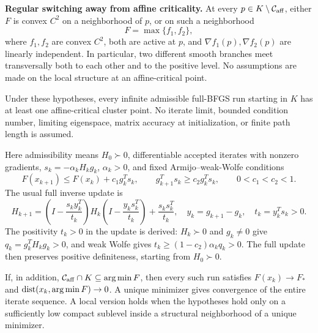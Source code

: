 \textbf{Regular switching away from affine criticality.} At every $p\in K\setminus\mathcal C_{\rm aff}$, either $F$ is convex $C^2$ on a neighborhood of $p$, or on such a neighborhood
\[
 F=\max\{f_1,f_2\},
\]
where $f_1,f_2$ are convex $C^2$, both are active at $p$, and $\nabla f_1(p),\nabla f_2(p)$ are linearly independent. In particular, two different smooth branches meet transversally both to each other and to the positive level. No assumptions are made on the local structure at an affine-critical point.

\begin{theorem}\label{C:thm:cluster}
Under these hypotheses, every infinite admissible full-BFGS run starting in $K$ has at least one affine-critical cluster point. No iterate limit, bounded condition number, limiting eigenspace, matrix accuracy at initialization, or finite path length is assumed.
\end{theorem}

Here admissibility means $H_0\succ0$, differentiable accepted iterates with nonzero gradients, $s_k=-\alpha_kH_kg_k$, $\alpha_k>0$, and fixed Armijo--weak-Wolfe conditions
\begin{equation}\label{C:eq:AW}
 F(x_{k+1})\le F(x_k)+c_1g_k^Ts_k,\qquad
 g_{k+1}^Ts_k\ge c_2g_k^Ts_k,\qquad 0<c_1<c_2<1.
\end{equation}
The usual full inverse update is
\begin{equation}\label{C:eq:bfgs}
 H_{k+1}=\left(I-\frac{s_ky_k^T}{t_k}\right)H_k
 \left(I-\frac{y_ks_k^T}{t_k}\right)+\frac{s_ks_k^T}{t_k},\quad
 y_k=g_{k+1}-g_k,\quad t_k=y_k^Ts_k>0.
\end{equation}
The positivity $t_k>0$ in the update is derived: $H_k\succ0$ and $g_k\ne0$ give $q_k=g_k^TH_kg_k>0$, and weak Wolfe gives $t_k\ge(1-c_2)\alpha_kq_k>0$. The full update then preserves positive definiteness, starting from $H_0\succ0$.

\begin{corollary}\label{C:cor:AC}
If, in addition, $\mathcal C_{\rm aff}\cap K\subseteq\arg\min F$, then every such run satisfies $F(x_k)\to F_*$ and $\operatorname{dist}(x_k,\arg\min F)\to0$. A unique minimizer gives convergence of the entire iterate sequence. A local version holds when the hypotheses hold only on a sufficiently low compact sublevel inside a structural neighborhood of a unique minimizer.
\end{corollary}

